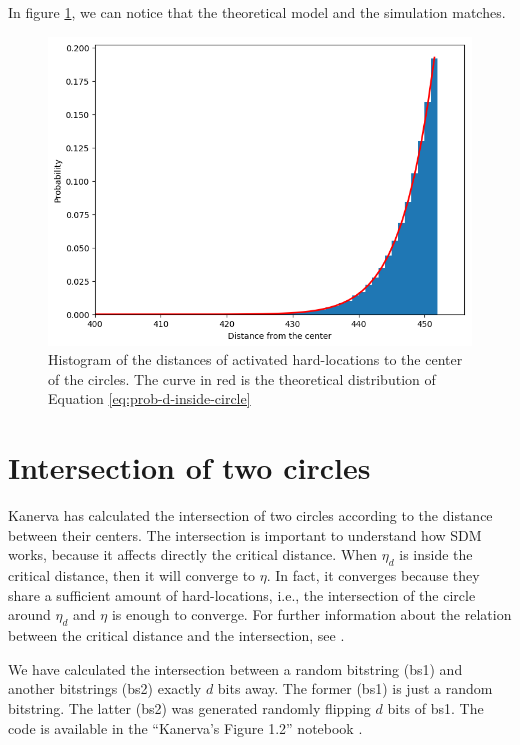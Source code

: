 In figure \ref{fig:validation-distance-activated-hls}, we can notice that the theoretical model and the simulation matches.

\begin{figure}[!htb]
\centering\includegraphics[width=\textwidth]{./images02/new-images/distance-activated-hls.png}

\caption{Histogram of the distances of activated hard-locations to the center of the circles. The curve in red is the theoretical distribution of Equation \ref{eq:prob-d-inside-circle}
\label{fig:validation-distance-activated-hls}}
\end{figure}

\section{Intersection of two circles}

Kanerva has calculated the intersection of two circles according to the distance between their centers. The intersection is important to understand how SDM works, because it affects directly the critical distance. When $\eta_d$ is inside the critical distance, then it will converge to $\eta$. In fact, it converges because they share a sufficient amount of hard-locations, i.e., the intersection of the circle around $\eta_d$ and $\eta$ is enough to converge. For further information about the relation between the critical distance and the intersection, see \citet{brogliato2014sparse}.

We have calculated the intersection between a random bitstring (bs1) and another bitstrings (bs2) exactly $d$ bits away. The former (bs1) is just a random bitstring. The latter (bs2) was generated randomly flipping $d$ bits of bs1. The code is available in the ``Kanerva's Figure 1.2'' notebook \citep{sdmframework}.

